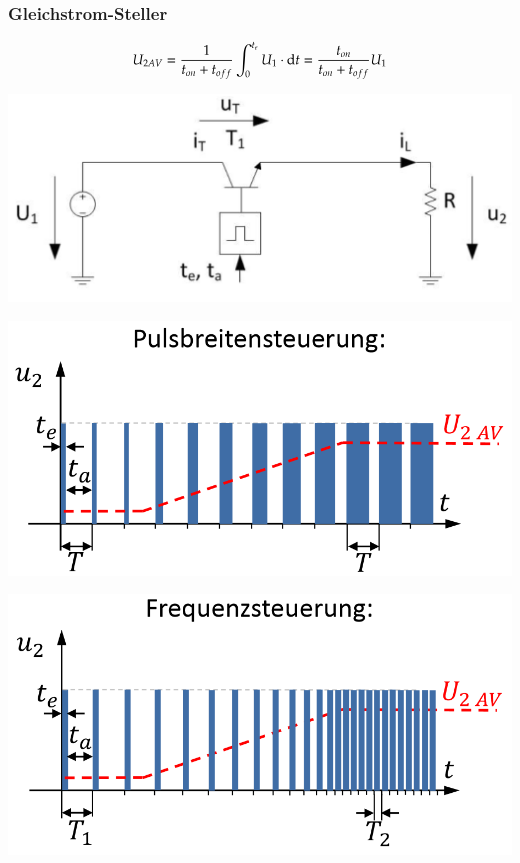 \subsubsection{Gleichstrom-Steller}
\begin{minipage}{0.5\linewidth}
\[ U_{2AV}=\frac{1}{t_{on}+t_{off}}\int_{0}^{t_e}U_1\cdot \mathop{}\!\mathrm{d} t = \frac{t_{on}}{t_{on}+t_{off}}U_1 \]
\end{minipage}
\begin{minipage}{0.4\linewidth}
\includegraphics[width=1.2\linewidth]{images/GsSteller}
\end{minipage}

\begin{minipage}{0.5\linewidth}
    \includegraphics[width=0.8\linewidth]{images/GsStellerPuls}
\end{minipage}
\begin{minipage}{0.5\linewidth}
    \includegraphics[width=0.8\linewidth]{images/GsStellerFreq}
\end{minipage}

\clearpage